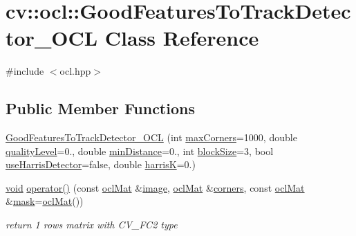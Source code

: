 \hypertarget{classcv_1_1ocl_1_1GoodFeaturesToTrackDetector__OCL}{\section{cv\-:\-:ocl\-:\-:Good\-Features\-To\-Track\-Detector\-\_\-\-O\-C\-L Class Reference}
\label{classcv_1_1ocl_1_1GoodFeaturesToTrackDetector__OCL}
}


{\ttfamily \#include $<$ocl.\-hpp$>$}

\subsection*{Public Member Functions}
\begin{DoxyCompactItemize}
\item 
\hyperlink{classcv_1_1ocl_1_1GoodFeaturesToTrackDetector__OCL_ac8eece5d2c570d394318a145c43a8705}{Good\-Features\-To\-Track\-Detector\-\_\-\-O\-C\-L} (int \hyperlink{classcv_1_1ocl_1_1GoodFeaturesToTrackDetector__OCL_ac8311ca2527c02b94d0e05d6b345e9ac}{max\-Corners}=1000, double \hyperlink{classcv_1_1ocl_1_1GoodFeaturesToTrackDetector__OCL_a19ac1b83bc6602c6a1a966e904ca215f}{quality\-Level}=0., double \hyperlink{classcv_1_1ocl_1_1GoodFeaturesToTrackDetector__OCL_a984603138318d1a9a1ebc5a42461c7e4}{min\-Distance}=0., int \hyperlink{classcv_1_1ocl_1_1GoodFeaturesToTrackDetector__OCL_a0a0cd73b830a541bc601822474288439}{block\-Size}=3, bool \hyperlink{classcv_1_1ocl_1_1GoodFeaturesToTrackDetector__OCL_abf60ed728142b02145b86ad2c68f06c6}{use\-Harris\-Detector}=false, double \hyperlink{classcv_1_1ocl_1_1GoodFeaturesToTrackDetector__OCL_af5c1120be137bb1253838cb0c7e0d35e}{harris\-K}=0.)
\item 
\hyperlink{legacy_8hpp_a8bb47f092d473522721002c86c13b94e}{void} \hyperlink{classcv_1_1ocl_1_1GoodFeaturesToTrackDetector__OCL_a7f55661fabe4b4b2b0de9fb8c1da98b9}{operator()} (const \hyperlink{classcv_1_1ocl_1_1oclMat}{ocl\-Mat} \&\hyperlink{legacy_8hpp_ad62b16ab219ae2483e8a3d921c44cc97}{image}, \hyperlink{classcv_1_1ocl_1_1oclMat}{ocl\-Mat} \&\hyperlink{imgproc__c_8h_a223e965e192c7025d6c6be77305f515b}{corners}, const \hyperlink{classcv_1_1ocl_1_1oclMat}{ocl\-Mat} \&\hyperlink{tracking_8hpp_a6b13ecd2fd6ec7ad422f1d7863c3ad19}{mask}=\hyperlink{classcv_1_1ocl_1_1oclMat}{ocl\-Mat}())
\begin{DoxyCompactList}\small\item\em return 1 rows matrix with C\-V\-\_\-F\-C2 type \end{DoxyCompactList}\item 

\end{DoxyCompactItemize}
